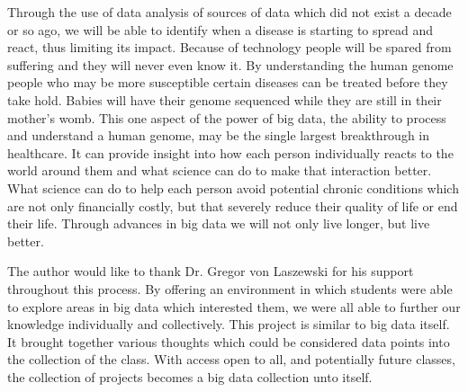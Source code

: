 \documentclass[sigconf]{acmart}
\begin{document}
Through the use of data analysis of sources of data which did not exist 
a decade or so ago, we will be able to identify when a disease is 
starting to spread and react, thus limiting its impact.  Because of 
technology people will be spared from suffering and they will never even 
know it.  By understanding the human genome people who may be more 
susceptible certain diseases can be treated before they take hold.  
Babies will have their genome sequenced while they are still in their 
mother's womb.  This one aspect of the power of big data, the ability 
to process and understand a human genome, may be the single largest 
breakthrough in healthcare.  It can provide insight into how each person 
individually reacts to the world around them and what science can do to 
make that interaction better.  What science can do to help each person 
avoid potential chronic conditions which are not only financially 
costly, but that severely reduce their quality of life or end their 
life.  Through advances in big data we will not only live longer, but 
live better.

\begin{acks}

  The author would like to thank Dr. Gregor von Laszewski for his 
  support throughout this process.  By offering an environment in which 
  students were able to explore areas in big data which interested them, 
  we were all able to further our knowledge individually and collectively.  
  This project is similar to big data itself.  It brought together 
  various thoughts which could be considered data points into the 
  collection of the class.  With access open to all, and potentially 
  future classes, the collection of projects becomes a big data collection 
  unto itself.

\end{acks}


 
\end{document}
